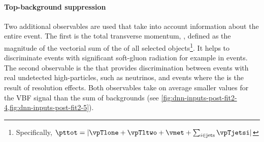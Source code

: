 \paragraph{Top-background suppression}
Two additional observables are used that take into account information about the entire event.
The first is the total transverse momentum, \pttot, defined as the magnitude of the vectorial sum of the \pT of all selected objects\footnote{Specifically, $\pttot = | \vpTlone + \vpTltwo + \vmet + \sum_{i \in \text{jets}} \vpTjetsi |$}. It helps to discriminate events with significant soft-gluon radiation for example in \ttbar events. The second observable is the \METSig that provides discrimination between events with real undetected high-\pT particles, such as neutrinos, and events where the \MET is the result of resolution effects. Both observables take on average smaller values for the VBF signal than the sum of backgrounds (see \cref{fig:dnn-inputs-post-fit2-4,fig:dnn-inputs-post-fit2-5}).

